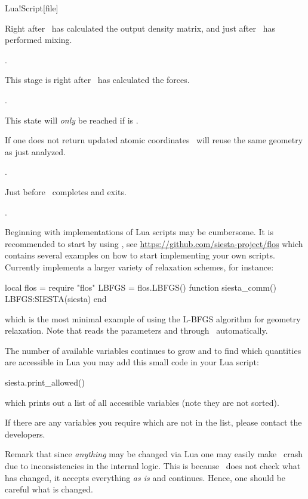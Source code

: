 \begin{fdfentry}{Lua!Script}[file]
\begin{fdfoptions}
    \option[SCF]%
    Right after \siesta\ has calculated the output density matrix, and
    just after \siesta\ has performed mixing.

    \note {}.

    \option[Forces]%
    This stage is right after \siesta\ has calculated the forces.

    \note {}.

    \option[Move]%
    This state will \emph{only} be reached if  is
    .

    If one does not return updated atomic coordinates \siesta\ will
    reuse the same geometry as just analyzed.

    \note {}.
    
    \option[Analysis]%
    Just before \siesta\ completes and exits. 

    \note {}.

  \end{fdfoptions}

  Beginning with implementations of Lua scripts may be cumbersome. It
  is recommended to start by using , see
  \url{https://github.com/siesta-project/flos} which contains several
  examples on how to start implementing your own scripts.
  Currently  implements a larger variety of relaxation
  schemes, for instance:
  \begin{codeexample}
    local flos = require "flos"
    LBFGS = flos.LBFGS()
    function siesta_comm()
       LBFGS:SIESTA(siesta)
    end
  \end{codeexample}
  which is the most minimal example of using the L-BFGS algorithm for
  geometry relaxation. Note that  reads the parameters
   and  through \siesta\
  automatically. 

  \note The number of available variables continues to grow and to
  find which quantities are accessible in Lua you may add this small
  code in your Lua script:
  \begin{codeexample}
    siesta.print_allowed()
  \end{codeexample}
  which prints out a list of all accessible variables (note they are
  not sorted).
  
  If there are any variables you require which are not in the list,
  please contact the developers.


  Remark that since \emph{anything} may be changed via Lua one may
  easily make \siesta\ crash due to inconsistencies in the internal
  logic. This is because \siesta\ does not check what has changed, it
  accepts everything \emph{as is} and continues. Hence, one should be
  careful what is changed.
  
\end{fdfentry}

